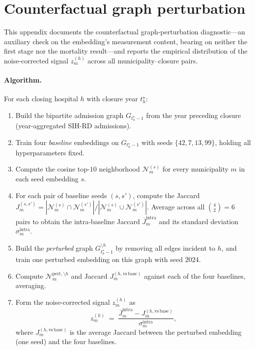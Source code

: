 \section{Counterfactual graph perturbation}
\label{app:perturbation}

This appendix documents the counterfactual graph-perturbation
diagnostic---an auxiliary check on the embedding's measurement content,
bearing on neither the first stage nor the mortality result---and reports
the empirical distribution of the noise-corrected signal $z_m^{(h)}$
across all municipality--closure pairs.

\paragraph{Algorithm.} For each closing hospital $h$ with closure year
$t_h^{\star}$:

\begin{enumerate}
    \item Build the bipartite admission graph $G_{t_h^{\star} - 1}$ from
    the year preceding closure (year-aggregated SIH-RD admissions).
    \item Train four \emph{baseline} embeddings on $G_{t_h^{\star} - 1}$
    with seeds $\{42, 7, 13, 99\}$, holding all hyperparameters fixed.
    \item Compute the cosine top-$10$ neighborhood
    $\mathcal{N}_m^{(s)}$ for every municipality $m$ in each seed
    embedding $s$.
    \item For each pair of baseline seeds $(s, s')$, compute the
    Jaccard $J_m^{(s, s')} = |\mathcal{N}_m^{(s)} \cap
    \mathcal{N}_m^{(s')}| / |\mathcal{N}_m^{(s)} \cup
    \mathcal{N}_m^{(s')}|$. Average across all $\binom{4}{2} = 6$ pairs
    to obtain the intra-baseline Jaccard
    $\overline{J}_m^{\mathrm{intra}}$ and its standard deviation
    $\sigma_m^{\mathrm{intra}}$.
    \item Build the \emph{perturbed} graph $G_{t_h^{\star} - 1}^{\setminus h}$
    by removing all edges incident to $h$, and train one perturbed
    embedding on this graph with seed $2024$.
    \item Compute $\mathcal{N}_m^{\mathrm{pert}, \setminus h}$ and
    Jaccard $J_m^{(h, \mathrm{vs\,base})}$ against each of the four
    baselines, averaging.
    \item Form the noise-corrected signal $z_m^{(h)}$ as
\begin{equation}
  z_m^{(h)} \;=\;
  \frac{\overline{J}_m^{\mathrm{intra}} - J_m^{(h, \mathrm{vs\,base})}}{
        \sigma_m^{\mathrm{intra}}},
  \label{eq:z-perturbation}
\end{equation}
    where $J_m^{(h, \mathrm{vs\,base})}$ is the average Jaccard between
    the perturbed embedding (one seed) and the four baselines.
\end{enumerate}

